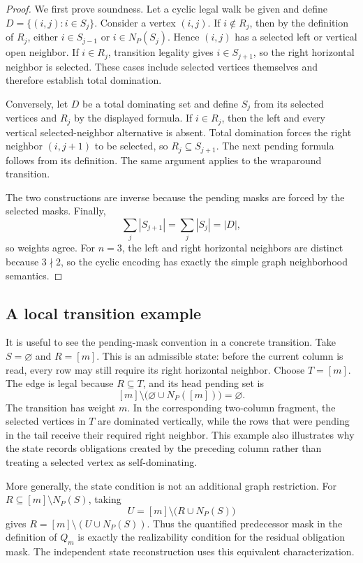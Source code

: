 \documentclass[11pt]{article}
\theoremstyle{definition}
\begin{document}
\begin{proof}
We first prove soundness. Let a cyclic legal walk be given and define
\(D=\{(i,j):i\in S_j\}\). Consider a vertex \((i,j)\). If
\(i\notin R_j\), then by the definition of \(R_j\), either
\(i\in S_{j-1}\) or \(i\in N_P(S_j)\). Hence \((i,j)\) has a selected left
or vertical open neighbor. If \(i\in R_j\), transition legality gives
\(i\in S_{j+1}\), so the right horizontal neighbor is selected. These cases
include selected vertices themselves and therefore establish total
domination.

Conversely, let \(D\) be a total dominating set and define \(S_j\) from its
selected vertices and \(R_j\) by the displayed formula. If \(i\in R_j\),
then the left and every vertical selected-neighbor alternative is absent.
Total domination forces the right neighbor \((i,j+1)\) to be selected, so
\(R_j\subseteq S_{j+1}\). The next pending formula follows from its
definition. The same argument applies to the wraparound transition.

The two constructions are inverse because the pending masks are forced by
the selected masks. Finally,
\[
\sum_j|S_{j+1}|=\sum_j|S_j|=|D|,
\]
so weights agree. For \(n=3\), the left and right horizontal neighbors are
distinct because \(3\nmid2\), so the cyclic encoding has exactly the simple
graph neighborhood semantics.
\end{proof}

\subsection{A local transition example}

It is useful to see the pending-mask convention in a concrete transition.
Take \(S=\varnothing\) and \(R=[m]\). This is an admissible state: before
the current column is read, every row may still require its right horizontal
neighbor. Choose \(T=[m]\). The edge is legal because \(R\subseteq T\), and
its head pending set is
\[
[m]\setminus\bigl(\varnothing\cup N_P([m])\bigr)=\varnothing.
\]
The transition has weight \(m\). In the corresponding two-column fragment,
the selected vertices in \(T\) are dominated vertically, while the rows that
were pending in the tail receive their required right neighbor. This example
also illustrates why the state records obligations created by the preceding
column rather than treating a selected vertex as self-dominating.

More generally, the state condition is not an additional graph restriction.
For \(R\subseteq[m]\setminus N_P(S)\), taking
\[
U=[m]\setminus\bigl(R\cup N_P(S)\bigr)
\]
gives \(R=[m]\setminus(U\cup N_P(S))\). Thus the quantified predecessor
mask in the definition of \(Q_m\) is exactly the realizability condition for
the residual obligation mask. The independent state reconstruction uses this
equivalent characterization.
\end{document}
